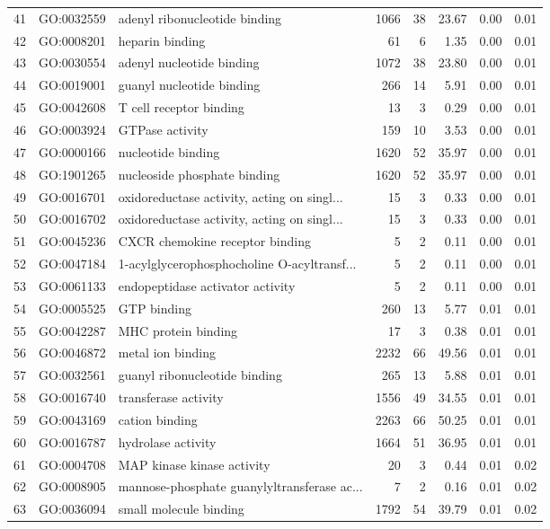 \begin{table}[ht]
\begin{tabular}{rllrrrrr}
  41 & GO:0032559 & adenyl ribonucleotide binding & 1066 &  38 & 23.67 & 0.00 & 0.01 \\ 
  42 & GO:0008201 & heparin binding &  61 &   6 & 1.35 & 0.00 & 0.01 \\ 
  43 & GO:0030554 & adenyl nucleotide binding & 1072 &  38 & 23.80 & 0.00 & 0.01 \\ 
  44 & GO:0019001 & guanyl nucleotide binding & 266 &  14 & 5.91 & 0.00 & 0.01 \\ 
  45 & GO:0042608 & T cell receptor binding &  13 &   3 & 0.29 & 0.00 & 0.01 \\ 
  46 & GO:0003924 & GTPase activity & 159 &  10 & 3.53 & 0.00 & 0.01 \\ 
  47 & GO:0000166 & nucleotide binding & 1620 &  52 & 35.97 & 0.00 & 0.01 \\ 
  48 & GO:1901265 & nucleoside phosphate binding & 1620 &  52 & 35.97 & 0.00 & 0.01 \\ 
  49 & GO:0016701 & oxidoreductase activity, acting on singl... &  15 &   3 & 0.33 & 0.00 & 0.01 \\ 
  50 & GO:0016702 & oxidoreductase activity, acting on singl... &  15 &   3 & 0.33 & 0.00 & 0.01 \\ 
  51 & GO:0045236 & CXCR chemokine receptor binding &   5 &   2 & 0.11 & 0.00 & 0.01 \\ 
  52 & GO:0047184 & 1-acylglycerophosphocholine O-acyltransf... &   5 &   2 & 0.11 & 0.00 & 0.01 \\ 
  53 & GO:0061133 & endopeptidase activator activity &   5 &   2 & 0.11 & 0.00 & 0.01 \\ 
  54 & GO:0005525 & GTP binding & 260 &  13 & 5.77 & 0.01 & 0.01 \\ 
  55 & GO:0042287 & MHC protein binding &  17 &   3 & 0.38 & 0.01 & 0.01 \\ 
  56 & GO:0046872 & metal ion binding & 2232 &  66 & 49.56 & 0.01 & 0.01 \\ 
  57 & GO:0032561 & guanyl ribonucleotide binding & 265 &  13 & 5.88 & 0.01 & 0.01 \\ 
  58 & GO:0016740 & transferase activity & 1556 &  49 & 34.55 & 0.01 & 0.01 \\ 
  59 & GO:0043169 & cation binding & 2263 &  66 & 50.25 & 0.01 & 0.01 \\ 
  60 & GO:0016787 & hydrolase activity & 1664 &  51 & 36.95 & 0.01 & 0.01 \\ 
  61 & GO:0004708 & MAP kinase kinase activity &  20 &   3 & 0.44 & 0.01 & 0.02 \\ 
  62 & GO:0008905 & mannose-phosphate guanylyltransferase ac... &   7 &   2 & 0.16 & 0.01 & 0.02 \\ 
  63 & GO:0036094 & small molecule binding & 1792 &  54 & 39.79 & 0.01 & 0.02 \\ 
   \hline
\end{tabular}
\end{table}
